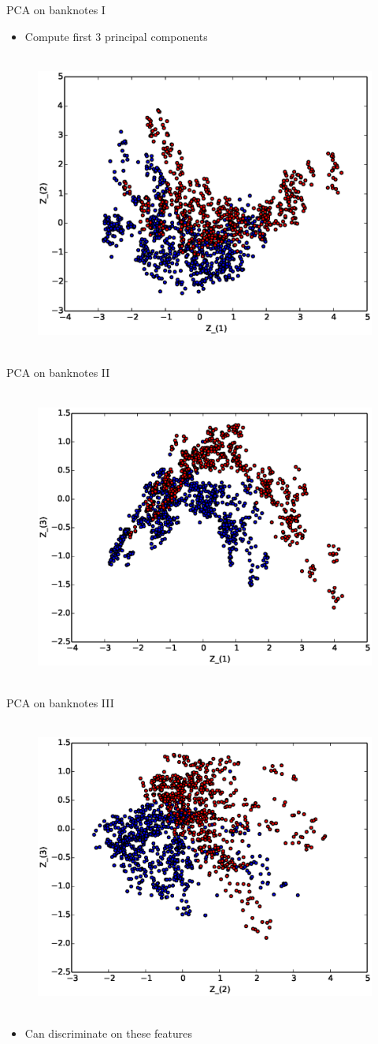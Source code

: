 \documentclass{beamer}
\begin{document}
\begin{frame}{PCA on banknotes I} 
\begin{itemize}
 \item Compute first 3 principal components 
\end{itemize}
  \begin{figure}[htp]
\mbox{
\includegraphics[width=0.5\linewidth]{Z12.eps}
}
\end{figure} 
\end{frame}

\begin{frame}{PCA on banknotes II}
  \begin{figure}[htp]
\mbox{
\includegraphics[width=0.5\linewidth]{Z13.eps}
}
\end{figure} 
\end{frame}

\begin{frame}{PCA on banknotes III} 
  \begin{figure}[htp]
\mbox{
\includegraphics[width=0.5\linewidth]{Z23.eps}
}
\end{figure} 
\begin{itemize}
 \item Can discriminate on these features 
\end{itemize}

\end{frame}
\end{document}

